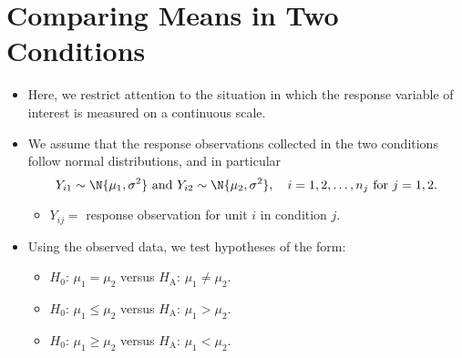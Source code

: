 \section{Comparing Means in Two Conditions}
\begin{itemize}
      \item Here, we restrict attention to the situation in which the response variable
            of interest is measured on a continuous scale.
      \item We assume that the response observations collected in the two conditions follow normal
            distributions, and in particular
            \[ Y_{i1}\sim \N{\mu_1,\sigma^2}\text{ and }Y_{i2} \sim \N{\mu_2,\sigma^2},\quad i=1,2,\ldots,n_j\text{ for } j=1,2. \]
            \begin{itemize}
                  \item $ Y_{ij}= $ response observation for unit $ i $ in condition $ j $.
            \end{itemize}
      \item Using the observed data, we test hypotheses of the form:
            \begin{itemize}
                  \item $ H_0 $: $ \mu_1=\mu_2 $ versus $ H_\text{A} $: $ \mu_1\ne\mu_2 $.
                  \item $ H_0 $: $ \mu_1\le\mu_2 $ versus $ H_\text{A} $: $ \mu_1>\mu_2 $.
                  \item $ H_0 $: $ \mu_1\ge\mu_2 $ versus $ H_\text{A} $: $ \mu_1<\mu_2 $.
            \end{itemize}
\end{itemize}
